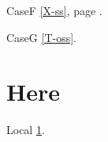 \documentclass{article}
\begin{document}
CaseF \ref{X-ss}, page \pageref{X-front}.

CaseG \ref{T-oss}.

\section{Here}\label{here}
Local \ref{here}.
\end{document}

